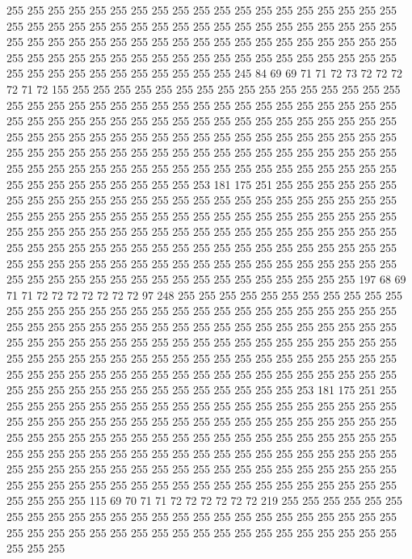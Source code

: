 255 255 255 255 255 255 255 255 255 255 255 255 255 255 255 255 255 255 255 255
255 255 255 255 255 255 255 255 255 255 255 255 255 255 255 255 255 255 255 255
255 255 255 255 255 255 255 255 255 255 255 255 255 255 255 255 255 255 255 255
255 255 255 255 255 255 255 255 255 255 255 255 255 255 255 255 255 255 255 255
255 255 255 255 255 255 255 245 84 69 69 71 71 72 73 72 72 72 72 71
72 155 255 255 255 255 255 255 255 255 255 255 255 255 255 255 255 255 255 255
255 255 255 255 255 255 255 255 255 255 255 255 255 255 255 255 255 255 255 255
255 255 255 255 255 255 255 255 255 255 255 255 255 255 255 255 255 255 255 255
255 255 255 255 255 255 255 255 255 255 255 255 255 255 255 255 255 255 255 255
255 255 255 255 255 255 255 255 255 255 255 255 255 255 255 255 255 255 255 255
255 255 255 255 255 255 255 255 255 255 255 255 255 255 255 255 255 255 255 255
255 255 253 181 175 251 255 255 255 255 255 255 255 255 255 255 255 255 255 255
255 255 255 255 255 255 255 255 255 255 255 255 255 255 255 255 255 255 255 255
255 255 255 255 255 255 255 255 255 255 255 255 255 255 255 255 255 255 255 255
255 255 255 255 255 255 255 255 255 255 255 255 255 255 255 255 255 255 255 255
255 255 255 255 255 255 255 255 255 255 255 255 255 255 255 255 255 255 255 255
255 255 255 255 255 255 255 255 255 255 255 255 255 255 255 255 255 255 255 255
255 255 255 255 197 68 69 71 71 72 72 72 72 72 72 72 97 248 255 255
255 255 255 255 255 255 255 255 255 255 255 255 255 255 255 255 255 255 255 255
255 255 255 255 255 255 255 255 255 255 255 255 255 255 255 255 255 255 255 255
255 255 255 255 255 255 255 255 255 255 255 255 255 255 255 255 255 255 255 255
255 255 255 255 255 255 255 255 255 255 255 255 255 255 255 255 255 255 255 255
255 255 255 255 255 255 255 255 255 255 255 255 255 255 255 255 255 255 255 255
255 255 255 255 255 255 255 255 255 255 255 255 255 255 255 255 255 255 253 181
175 251 255 255 255 255 255 255 255 255 255 255 255 255 255 255 255 255 255 255
255 255 255 255 255 255 255 255 255 255 255 255 255 255 255 255 255 255 255 255
255 255 255 255 255 255 255 255 255 255 255 255 255 255 255 255 255 255 255 255
255 255 255 255 255 255 255 255 255 255 255 255 255 255 255 255 255 255 255 255
255 255 255 255 255 255 255 255 255 255 255 255 255 255 255 255 255 255 255 255
255 255 255 255 255 255 255 255 255 255 255 255 255 255 255 255 255 255 255 255
255 115 69 70 71 71 72 72 72 72 72 72 219 255 255 255 255 255 255 255
255 255 255 255 255 255 255 255 255 255 255 255 255 255 255 255 255 255 255 255
255 255 255 255 255 255 255 255 255 255 255 255 255 255 255 255 255 255 255 255
